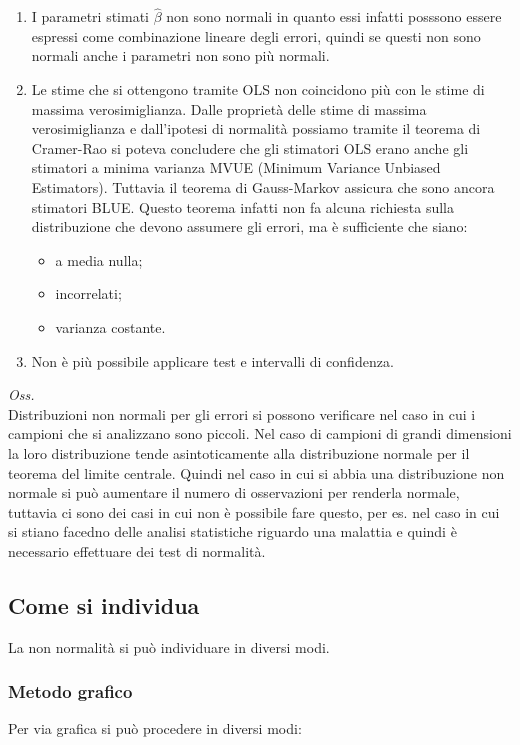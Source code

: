\begin{enumerate}
	\item I parametri stimati $\hat{\beta}$ non sono normali in quanto essi infatti posssono essere espressi come combinazione lineare degli errori, quindi se questi non sono normali anche i parametri non sono più normali.
	\item Le stime che si ottengono tramite OLS non coincidono più con le stime di massima verosimiglianza. Dalle proprietà delle stime di massima verosimiglianza e dall'ipotesi di normalità possiamo tramite il teorema di Cramer-Rao si poteva concludere che gli stimatori OLS erano anche gli stimatori a minima varianza MVUE (Minimum Variance Unbiased Estimators). Tuttavia il teorema di Gauss-Markov assicura che sono ancora stimatori BLUE. Questo teorema infatti non fa alcuna richiesta sulla distribuzione che devono assumere gli errori, ma è sufficiente che siano:
	\begin{itemize}
		\item a media nulla;
		\item incorrelati;
		\item varianza costante.
	\end{itemize}
	\item Non è più possibile applicare test e intervalli di confidenza.
\end{enumerate}

\textit{Oss.}\\
Distribuzioni non normali per gli errori si possono verificare nel caso in cui i campioni che si analizzano sono piccoli. Nel caso di campioni di grandi dimensioni la loro distribuzione tende asintoticamente alla distribuzione normale per il teorema del limite centrale. Quindi nel caso in cui si abbia una distribuzione non normale si può aumentare il numero di osservazioni per renderla normale, tuttavia ci sono dei casi in cui non è possibile fare questo, per es. nel caso in cui si stiano facedno delle analisi statistiche riguardo una malattia e quindi è necessario effettuare dei test di normalità.

\subsection{Come si individua}
La non normalità si può individuare in diversi modi.

\subsubsection{Metodo grafico}
Per via grafica si può procedere in diversi modi:

